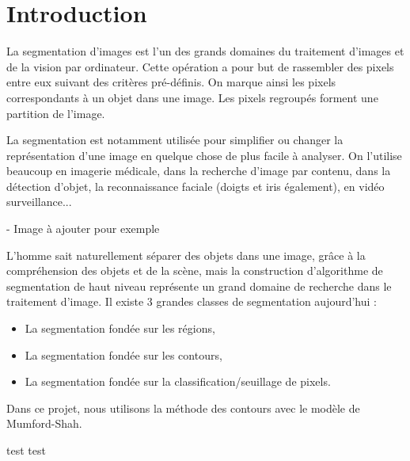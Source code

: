 \section{Introduction}
La segmentation d'images est l'un des grands domaines du traitement d'images et de la vision par ordinateur. Cette opération a pour but de rassembler des pixels entre eux suivant des critères pré-définis. On marque ainsi les pixels correspondants à un objet dans une image. Les pixels regroupés forment une partition de l'image.

\bigskip

La segmentation est notamment utilisée pour simplifier ou changer la représentation d'une image en quelque chose de plus facile à analyser. On l'utilise beaucoup en imagerie médicale, dans la recherche d'image par contenu, dans la détection d'objet, la reconnaissance faciale (doigts et iris également), en vidéo surveillance...

- Image à ajouter pour exemple 

\bigskip

L'homme sait naturellement séparer des objets dans une image, grâce à la compréhension des objets et de la scène, mais la construction d'algorithme de segmentation de haut niveau représente un grand domaine de recherche dans le traitement d'image. Il existe 3 grandes classes de segmentation aujourd'hui :
\begin{itemize}
\item La segmentation fondée sur les régions,
\item La segmentation fondée sur les contours,
\item La segmentation fondée sur la classification/seuillage de pixels.
\end{itemize}


Dans ce projet, nous utilisons la méthode des contours avec le modèle de Mumford-Shah.

test test 
